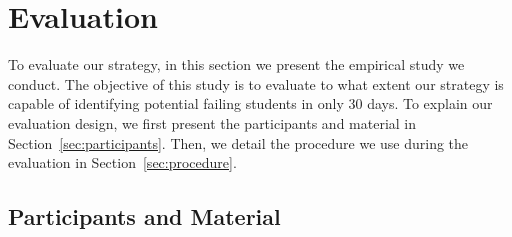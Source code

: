 \section{Evaluation}

\label{sec:evaluation}

To evaluate our strategy, in this section we present the empirical study we conduct. The objective of this study is to evaluate to what extent our strategy is capable of identifying potential failing students in only 30 days. To explain our evaluation design, we first present the participants and material in Section~\ref{sec:participants}. Then, we detail the procedure we use during the evaluation in Section~\ref{sec:procedure}.

%
%
%





\subsection{Participants and Material}

